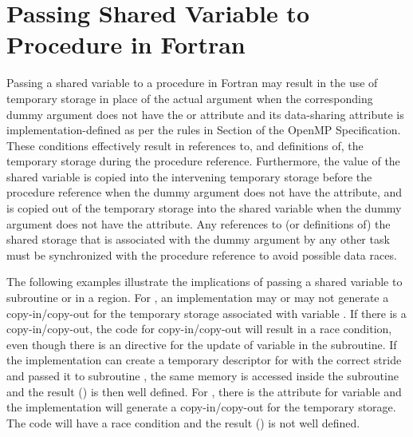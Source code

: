 \section{Passing Shared Variable to Procedure in Fortran}
\fortranspecificstart
\label{sec:fort_shared_var}

Passing a shared variable to a procedure in Fortran may result in the use of
temporary storage in place of the actual argument when the corresponding dummy 
argument does not have the  or  attribute and 
its data-sharing attribute is implementation-defined as per the rules in 
Section  of
the OpenMP Specification. 
These conditions effectively result in references to, and definitions of, the 
temporary storage during the procedure reference. Furthermore, the value of the 
shared variable is copied into the intervening temporary storage before the 
procedure reference when the dummy argument does not have the 
 attribute, and is copied out of the temporary storage into 
the shared variable when the dummy argument does not have the 
 attribute. Any references to (or definitions of) the shared 
storage that is associated with the dummy argument by any other task must be 
synchronized with the procedure reference to avoid possible data races.

The following examples illustrate the implications of passing a shared 
variable  to subroutine  or  in
a  region.
For , an implementation may or may not generate a copy-in/copy-out 
for the temporary storage associated with variable . 
If there is a copy-in/copy-out, the code for copy-in/copy-out will result in 
a race condition, even though there is an 
directive for the update of variable  in the subroutine. 
If the implementation can create a temporary descriptor for  
with the correct stride and passed it to subroutine , 
the same memory is accessed inside the subroutine and the result 
() is then well defined.
For , there is the  attribute for 
variable  and the implementation will generate a copy-in/copy-out 
for the temporary storage.
The code will have a race condition and the result () is
not well defined.

\fortranspecificend

